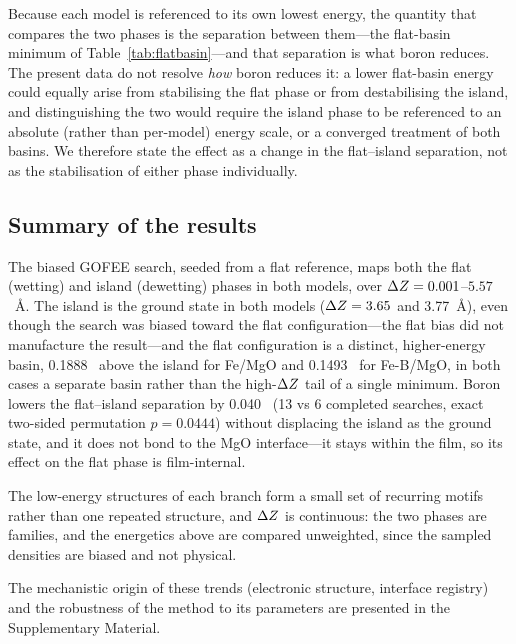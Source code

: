 Because each model is referenced to its own lowest energy, the quantity that compares the two phases
is the separation between them---the flat-basin minimum of Table~\ref{tab:flatbasin}---and
that separation is what boron reduces. The present data do not resolve \emph{how} boron reduces it: a
lower flat-basin energy could equally arise from stabilising the flat phase or from destabilising the
island, and distinguishing the two would require the island phase to be referenced to an absolute
(rather than per-model) energy scale, or a converged treatment of both basins. We therefore state the
effect as a change in the flat--island separation, not as the stabilisation of either phase
individually.

\subsection{Summary of the results}
\label{sec:summary}

The biased GOFEE search, seeded from a flat reference, maps both the flat (wetting) and island
(dewetting) phases in both models, over $\Delta Z = 0.001$--$5.57$~\AA. The island is the ground state in
both models ($\Delta Z = 3.65$ and 3.77~\AA), even though the search was biased toward the flat
configuration---the flat bias did not manufacture the result---and the flat configuration is a
distinct, higher-energy basin, 0.1888~\eVA{} above the island for Fe/MgO and 0.1493~\eVA{} for
Fe-B/MgO, in both cases a separate basin rather than the high-$\Delta Z$ tail of a single minimum. Boron
lowers the flat--island separation by 0.040~\eVA{} (13 vs 6 completed searches, exact two-sided
permutation $p = 0.0444$) without displacing the island as the ground state, and it does not bond to
the MgO interface---it stays within the film, so its effect on the flat phase is film-internal.

The low-energy structures of each branch form a small set of recurring motifs rather than one
repeated structure, and $\Delta Z$ is continuous: the two phases are families, and the energetics above
are compared unweighted, since the sampled densities are biased and not physical.

The mechanistic origin of these trends (electronic structure, interface registry) and the robustness
of the method to its parameters are presented in the Supplementary Material.
